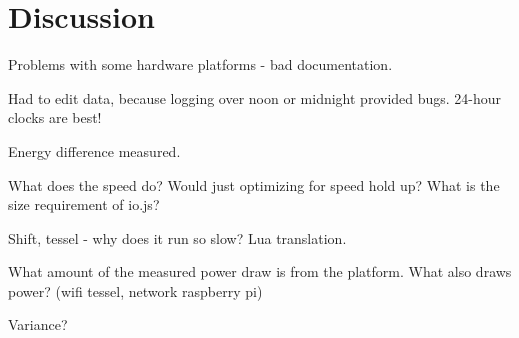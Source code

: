 \chapter{Discussion}
\label{ch:chapter4}

Problems with some hardware platforms - bad documentation.

Had to edit data, because logging over noon or midnight provided bugs. 24-hour clocks are best!

Energy difference measured.

What does the speed do? Would just optimizing for speed hold up?
What is the size requirement of io.js?


Shift, tessel - why does it run so slow? Lua translation.

What amount of the measured power draw is from the platform. What also draws power? (wifi tessel, network raspberry pi)

Variance?